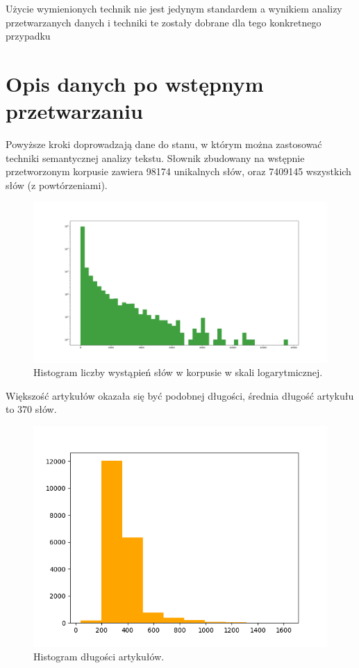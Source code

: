 \documentclass[pl]{minipw} %
\begin{document}
Użycie wymienionych technik nie jest jedynym standardem a wynikiem analizy przetwarzanych danych i techniki te zostały dobrane dla tego konkretnego przypadku

\section{Opis danych po wstępnym przetwarzaniu}

Powyższe kroki doprowadzają dane do stanu, w którym można zastosować techniki semantycznej analizy tekstu. Słownik zbudowany na wstępnie przetworzonym korpusie zawiera 98174 unikalnych słów, oraz 7409145 wszystkich słów (z powtórzeniami).

\begin{figure}[H]
	\centering
	\includegraphics[width=1\textwidth]{img/words_hist_log.png}
	\caption{Histogram liczby wystąpień słów w korpusie w skali logarytmicznej.}
\end{figure}

Większość artykułów okazała się być podobnej długości, średnia długość artykułu to 370 słów.

\begin{figure}[H]
	\centering
	\includegraphics[width=1\textwidth]{img/articles_length_hist.png}
	\caption{Histogram długości artykułów.}
\end{figure}
\end{document}
